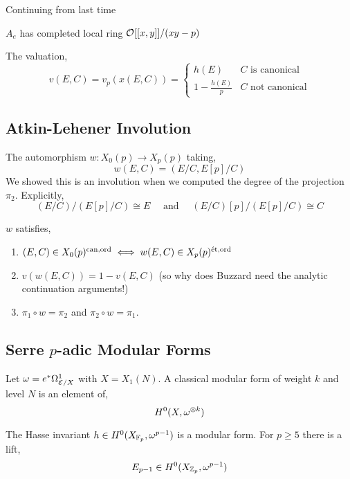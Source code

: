\documentclass[12pt]{article}
\begin{document}
Continuing from last time






$A_e$ has completed local ring $\mathcal{O}_{}[[x,y]]/(xy - p)$

\begin{prop}
The valuation,
\[ v(E, C) = v_p(x(E, C)) = 
\begin{cases}
h(E) & C \text{ is canonical}
\\
1 - \frac{h(E)}{p} & C \text{ not canonical} 
\end{cases} \]
\end{prop}

\subsection{Atkin-Lehener Involution}

\begin{defn}
The automorphism $w : X_0(p) \to X_p(p)$ taking,
\[ w(E, C) = (E/C, E[p]/C) \]
We showed this is an involution when we computed the degree of the projection $\pi_2$. Explicitly,
\[ (E/C)/(E[p]/C) \cong E \quad \text{ and } \quad (E/C)[p]/(E[p]/C) \cong C \]
\end{defn}

\begin{prop}
$w$ satisfies,
\begin{enumerate}
\item $(E, C) \in X_0(p)^{\mathrm{can}, \operatorname{\mathrm{ord}}} \iff w(E,C) \in X_p(p)^{\text{\'{e}t}, \operatorname{\mathrm{ord}}}$
\item $v(w(E, C)) = 1 - v(E, C)$ (so why does Buzzard need the analytic continuation arguments!)
\item $\pi_1 \circ w = \pi_2$ and $\pi_2 \circ w = \pi_1$.  
\end{enumerate}
\end{prop}

\subsection{Serre $p$-adic Modular Forms}

\begin{defn}
Let $\omega = e^* \Omega^1_{\mathcal{E}/X}$ with $X = X_1(N)$. A classical modular form of weight $k$ and level $N$ is an element of,
\[ H^0(X, \omega^{\otimes k}) \]
\end{defn}

\begin{example}
The Hasse invariant $h \in H^0(X_{\mathbb{F}_p}, \omega^{p-1})$ is a modular form. For $p \ge 5$ there is a lift,
\[ E_{p-1} \in H^0(X_{\mathbb{Z}_p}, \omega^{p-1}) \]
\end{example}
\end{document}
